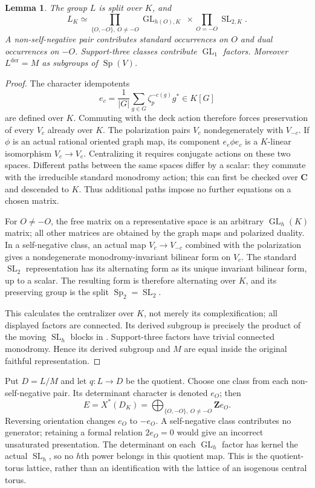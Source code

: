 \documentclass[11pt]{article}
\newtheorem{lemma}[theorem]{Lemma}
\theoremstyle{definition}
\newcommand{\C}{\mathbf C}
\newcommand{\Z}{\mathbf Z}
\newcommand{\SL}{\operatorname{SL}}
\newcommand{\GL}{\operatorname{GL}}
\newcommand{\Sp}{\operatorname{Sp}}
\begin{document}
\begin{lemma}\label{lem:ambient}
The group $L$ is split over $K$, and
\[
 L_K\simeq
 \prod_{\{O,-O\},\ O\ne-O}\GL_{h(O),K}
 \ \times\prod_{O=-O}\SL_{2,K}.
\]
A non-self-negative pair contributes standard occurrences on $O$ and dual
occurrences on $-O$. Support-three classes contribute $\GL_1$ factors.
Moreover $L^{\mathrm{der}}=M$ as subgroups of $\Sp(V)$.
\end{lemma}
\begin{proof}
The character idempotents
\[
 e_c=\frac1{|G|}\sum_{g\in G}\zeta_p^{-c(g)}g^*
       \in K[G]
\]
are defined over $K$. Commuting with the deck action therefore forces
preservation of every $V_c$ already over $K$. The polarization pairs
$V_c$ nondegenerately with $V_{-c}$. If $\phi$ is an actual rational
oriented graph map, its component $e_e\phi e_c$ is a $K$-linear
isomorphism $V_c\to V_e$. Centralizing it requires conjugate actions on
these two spaces. Different paths between the same spaces differ by a
scalar: they commute with the irreducible standard monodromy action;
this can first be checked over $\C$ and descended to $K$. Thus additional
paths impose no further equations on a chosen matrix.

For $O\ne-O$, the free matrix on a representative space is an arbitrary
$\GL_h(K)$ matrix; all other matrices are obtained by the graph maps and
polarized duality. In a self-negative class, an actual map
$V_c\to V_{-c}$ combined with the polarization gives a nondegenerate
monodromy-invariant bilinear form on $V_c$. The standard $\SL_2$
representation has its alternating form as its unique invariant bilinear
form, up to a scalar. The resulting form is therefore alternating over
$K$, and its preserving group is the split $\Sp_2=\SL_2$.

This calculates the centralizer over $K$, not merely its complexification;
all displayed factors are connected. Its derived subgroup is precisely
the product of the moving $\SL_h$ blocks in
\cite[Theorem 3.1]{General}. Support-three factors have trivial connected
monodromy. Hence its derived subgroup and $M$ are equal inside the original
faithful representation.
\end{proof}

Put $D=L/M$ and let $q:L\to D$ be the quotient. Choose one class from
each non-self-negative pair. Its determinant character is denoted $e_O$;
then
\[
 E=X^*(D_K)=\bigoplus_{\{O,-O\},\ O\ne-O}\Z e_O.
\]
Reversing orientation changes $e_O$ to $-e_O$. A self-negative class
contributes no generator; retaining a formal relation $2e_O=0$ would give
an incorrect unsaturated presentation. The determinant on each $\GL_h$
factor has kernel the actual $\SL_h$, so no $h$th power belongs in this
quotient map. This is the quotient-torus lattice, rather than an
identification with the lattice of an isogenous central torus.
\end{document}
